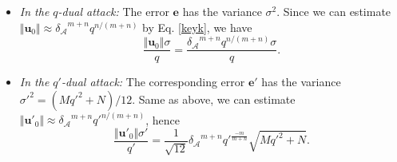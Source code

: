 \documentclass{cta-author}
\begin{document}
\begin{itemize}
	\item \textit{In the $q$-dual attack:} The error $\mathbf{e}$ has the variance $\sigma^2$. Since we can estimate $\Vert \mathbf{u}_0\Vert\approx {\delta_{\mathcal{A}}}^{m+n}q^{n/(m+n)}$ by Eq.  \eqref{keyk}, we have $$\frac{\Vert \mathbf{u}_0\Vert\sigma}{q}=\frac{{\delta_{\mathcal{A}}}^{m+n}q^{n/(m+n)}{\sigma}}{q}.$$
	
	\item\textit{ In the $q'$-dual attack:} The corresponding error $\mathbf{e'}$ has the variance $\sigma'^2=(M{q'}^2+N)/12$. Same as above, we can estimate $\Vert \mathbf{u}'_{0}\Vert\approx {\delta_{\mathcal{A}}}^{m+n}{q'}^{n/(m+n)}$, hence
	$$\frac{\Vert \mathbf{u}'_{0}\Vert\sigma'}{q'}=\frac{1}{\sqrt{12}}{\delta_{\mathcal{A}}}^{m+n}{q'}^{\frac{-m}{m+n}}\sqrt{M{q'}^2+N}.$$
\end{itemize}
\end{document}
